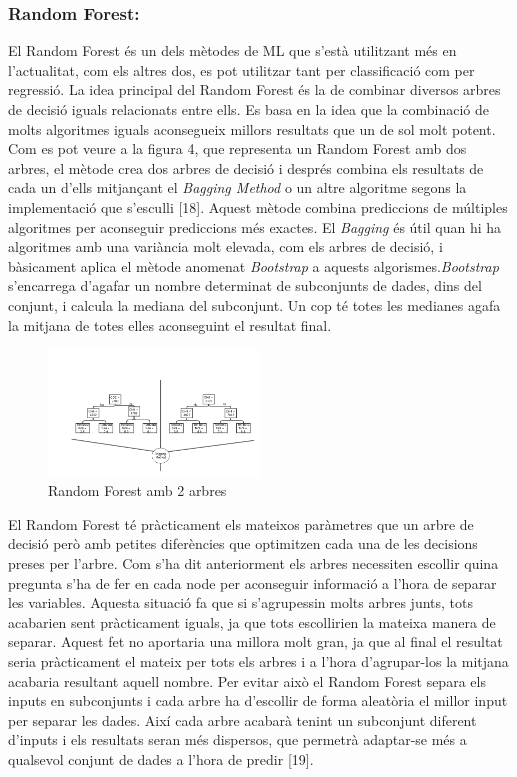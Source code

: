 \documentclass[10pt,a4paper,twocolumn,twoside]{article}
\begin{document}
\subsubsection{Random Forest:}
El Random Forest és un dels mètodes de ML que s'està utilitzant més en l'actualitat, com els altres dos, es pot utilitzar tant per classificació com per regressió. La idea principal del Random Forest és la de combinar diversos arbres de decisió iguals relacionats entre ells. Es basa en la idea que la combinació de molts algoritmes iguals aconsegueix millors resultats que un de sol molt potent. Com es pot veure a la figura 4, que representa un Random Forest amb dos arbres, el mètode crea dos arbres de decisió i després combina els resultats de cada un d'ells mitjançant el \textit{Bagging Method} o un altre algoritme segons la implementació que s'esculli [18]. Aquest mètode combina prediccions de múltiples algoritmes per aconseguir prediccions més exactes. El \textit{Bagging} és útil quan hi ha algoritmes amb una variància molt elevada, com els arbres de decisió, i bàsicament aplica el mètode anomenat \textit{Bootstrap} a aquests algorismes.\textit{Bootstrap} s'encarrega d'agafar un nombre determinat de subconjunts de dades, dins del conjunt, i calcula la mediana del subconjunt. Un cop té totes les medianes agafa la mitjana de totes elles aconseguint el resultat final.
\begin{figure}[!h]
\centering
	\includegraphics[width=0.5\textwidth]{../img/randomForest}
	\caption{Random Forest amb 2 arbres}
	\label{fig-RandomForest}
\end{figure}

El Random Forest té pràcticament els mateixos paràmetres que un arbre de decisió però amb petites diferències que optimitzen cada una de les decisions preses per l'arbre. Com s'ha dit anteriorment els arbres necessiten escollir quina pregunta s'ha de fer en cada node per aconseguir informació a l'hora de separar les variables. Aquesta situació fa que si s'agrupessin molts arbres junts, tots acabarien sent pràcticament iguals, ja que tots escollirien la mateixa manera de separar. Aquest fet no aportaria una millora molt gran, ja que al final el resultat seria pràcticament el mateix per tots els arbres i a l'hora d'agrupar-los la mitjana acabaria resultant aquell nombre. Per evitar això el Random Forest separa els inputs en subconjunts i cada arbre ha d'escollir de forma aleatòria el millor input per separar les dades. Així cada arbre acabarà tenint un subconjunt diferent d'inputs i els resultats seran més dispersos, que permetrà adaptar-se més a qualsevol conjunt de dades a l'hora de predir [19].
\end{document}
